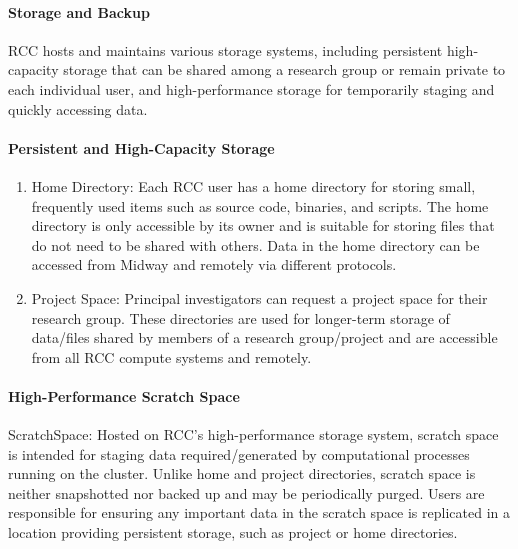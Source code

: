 \paragraph*{Storage and Backup}

RCC hosts and maintains various storage systems, including persistent high-capacity storage that can be shared among a research group or remain private to each individual user, and high-performance storage for temporarily staging and quickly accessing data.

\paragraph*{Persistent and High-Capacity Storage}
\begin{enumerate}

\item  Home Directory: Each RCC user has a home directory for storing small, frequently used items such as source code, binaries, and scripts. The home directory is only accessible by its owner and is suitable for storing files that do not need to be shared with others. Data in the home directory can be accessed from Midway and remotely via different protocols.

\item  Project Space: Principal investigators can request a project space for their research group. These directories are used for longer-term storage of data/files shared by members of a research group/project and are accessible from all RCC compute systems and remotely.
\end{enumerate}

\paragraph*{High-Performance Scratch Space}

ScratchSpace: Hosted on RCC's high-performance storage system, scratch space is intended for staging data required/generated by computational processes running on the cluster. Unlike home and project directories, scratch space is neither snapshotted nor backed up and may be periodically purged. Users are responsible for ensuring any important data in the scratch space is replicated in a location providing persistent storage, such as project or home directories.

